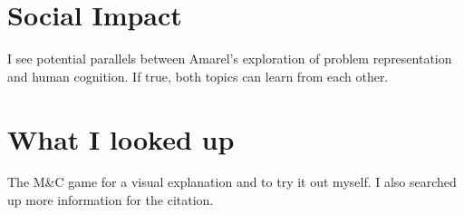 \documentclass[12pt, letterpaper]{article}
\begin{document}
\section{Social Impact}
\label{sec:impact}
I see potential parallels between Amarel's exploration of problem representation and human cognition. If true, both topics can learn from each other.

\section{What I looked up}
\label{sec:looked up}
The M&C game for a visual explanation and to try it out myself. I also searched up more information for the citation.


\end{document}
